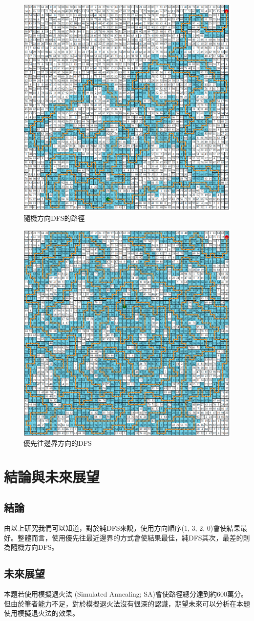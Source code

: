 \documentclass[12pt, a4paper]{article}
\begin{document}
\begin{figure}[H]
    \centering
    \includegraphics[width=0.6\linewidth]{path_ran.png}
    \caption{隨機方向DFS的路徑}
\end{figure}

\begin{figure}[H]
    \centering
    \includegraphics[width=0.6\linewidth]{path_wfs.png}
    \caption{優先往邊界方向的DFS}
\end{figure}

\section{結論與未來展望}
\subsection{結論}

由以上研究我們可以知道，對於純DFS來說，使用方向順序(1, 3, 2, 0)會使結果最好。整體而言，使用優先往最近邊界的方式會使結果最佳，純DFS其次，最差的則為隨機方向DFS。

\subsection{未來展望}

本題若使用模擬退火法 (Simulated Annealing; SA)會使路徑總分達到約600萬分。但由於筆者能力不足，對於模擬退火法沒有很深的認識，期望未來可以分析在本題使用模擬退火法的效果。

\nocite{*}
\printbibliography[title={參考文獻}]
\end{document}
